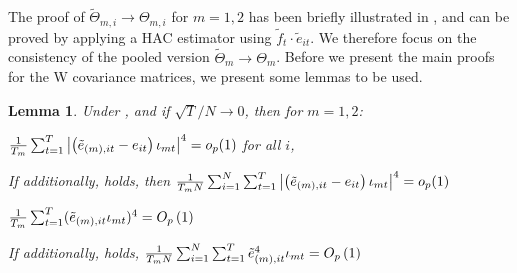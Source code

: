 \documentclass[12pt]{article}
\newtheorem{lemma}{Lemma}
\theoremstyle{plain}
\numberwithin{equation}{section}
\begin{document}
The proof of $\tilde{\Theta}_{m, i} \to \Theta_{m, i}$ for $m = 1, 2$ has been briefly illustrated in \textcite{bai_inferential_2003}, and can be proved by applying a HAC estimator using $\tilde{f}_t \cdot \tilde{e}_{it}$. We therefore focus on the consistency of the pooled version $\tilde{\Theta}_{m} \to \Theta_{m}$. Before we present the main proofs for the W covariance matrices, we present some lemmas to be used.
\begin{lemma}
\label{lem:w_cov_error}
Under , and if $\sqrt{T}/N \to 0$, then for $m = 1, 2$:
\begin{lemenum}
\item \label{lem:w_cov_error:1}
$\frac{1}{T_m} \sum_{t = 1}^{T} \abs{\left( \tilde{e}_{(m), it} - e_{it}\right)\iota_{mt} }^4 = o_p(1)$ for all $i$,
\item \label{lem:w_cov_error:2}
If additionally,  holds, then $\frac{1}{T_m N} \sum_{i = 1}^{N} \sum_{t = 1}^{T} \abs{\left( \tilde{e}_{(m), it} - e_{it} \right) \iota_{mt} }^4  = o_p(1)$
\item \label{lem:w_cov_error:3}
$\frac{1}{T_m} \sum_{t = 1}^{T} (\tilde{e}_{(m), it} \iota_{mt} )^4  = O_p \left( 1 \right)$
\item \label{lem:w_cov_error:4}
If additionally,  holds,
$\frac{1}{T_m N} \sum_{i = 1}^{N} \sum_{t = 1}^{T} \tilde{e}_{(m), it}^4 \iota_{mt} = O_p \left( 1 \right)$
\end{lemenum}
\end{lemma}
\end{document}
